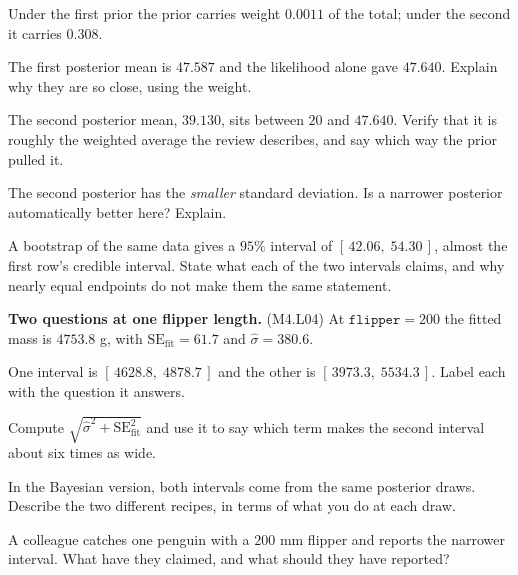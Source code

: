 \documentclass[11pt]{article}
\newcommand{\answerspace}[1]{\vspace{#1}}
\newcommand{\lo}[1]{{\normalfont\small (#1)}}
\begin{document}
\begin{questions}
\noindent Under the first prior the prior carries weight $0.0011$ of the total; under the second it
carries $0.308$.

\begin{parts}
\item The first posterior mean is $47.587$ and the likelihood alone gave $47.640$. Explain why they
are so close, using the weight.
\answerspace{3.5em}

\item The second posterior mean, $39.130$, sits between $20$ and $47.640$. Verify that it is roughly
the weighted average the review describes, and say which way the prior pulled it.
\answerspace{4em}

\item The second posterior has the \emph{smaller} standard deviation. Is a narrower posterior
automatically better here? Explain.
\answerspace{4em}

\item A bootstrap of the same data gives a $95\%$ interval of $[\,42.06,\; 54.30\,]$, almost the
first row's credible interval. State what each of the two intervals claims, and why nearly equal
endpoints do not make them the same statement.
\answerspace{5em}
\end{parts}

\item \textbf{Two questions at one flipper length.} \lo{M4.L04} At $\texttt{flipper} = 200$ the
fitted mass is $4753.8$ g, with $\text{SE}_{\text{fit}} = 61.7$ and $\hat\sigma = 380.6$.

\begin{parts}
\item One interval is $[\,4628.8,\; 4878.7\,]$ and the other is $[\,3973.3,\; 5534.3\,]$. Label each
with the question it answers.
\answerspace{3.5em}

\item Compute $\sqrt{\hat\sigma^2 + \text{SE}_{\text{fit}}^2}$ and use it to say which term makes
the second interval about six times as wide.
\answerspace{4em}

\item In the Bayesian version, both intervals come from the same posterior draws. Describe the two
different recipes, in terms of what you do at each draw.
\answerspace{4.5em}

\item A colleague catches one penguin with a $200$ mm flipper and reports the narrower interval.
What have they claimed, and what should they have reported?
\answerspace{3.5em}
\end{parts}


\end{questions}
\end{document}
